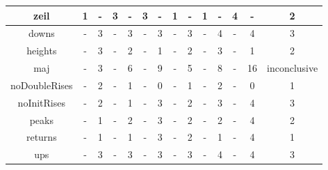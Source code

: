 \documentclass[12pt]{article}
\begin{document}
\begin{table}[H]
\begin{tabular}{c | c c c c c c c c c c c c | c}
zeil & 1 & - & 3 & - & 3 & - & 1 & - & 1 & - & 4 & - & 2\\
\hline
downs & - & 3 & - & 3 & - & 3 & - & 3 & - & 4 & - & 4 & 3\\
heights & - & 3 & - & 2 & - & 1 & - & 2 & - & 3 & - & 1 & 2\\
maj & - & 3 & - & 6 & - & 9 & - & 5 & - & 8 & - & 16 & inconclusive\\
noDoubleRises & - & 2 & - & 1 & - & 0 & - & 1 & - & 2 & - & 0 & 1\\
noInitRises & - & 2 & - & 1 & - & 3 & - & 2 & - & 3 & - & 4 & 3\\
peaks & - & 1 & - & 2 & - & 3 & - & 2 & - & 2 & - & 4 & 2\\
returns & - & 1 & - & 1 & - & 3 & - & 2 & - & 1 & - & 4 & 1\\
ups & - & 3 & - & 3 & - & 3 & - & 3 & - & 4 & - & 4 & 3\\
\hline
\end{tabular}
\label{table:StandardPerms1}
\end{table}
\end{document}
